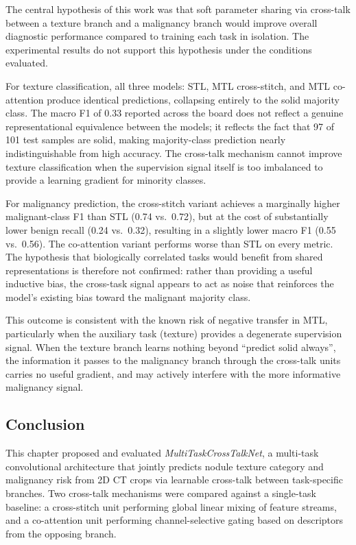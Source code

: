 The central hypothesis of this work was that soft parameter sharing via cross-talk between a texture branch and a malignancy branch would improve overall diagnostic performance compared to training each task in isolation. The experimental results do not support this hypothesis under the conditions evaluated.

For texture classification, all three models: STL, MTL cross-stitch, and MTL co-attention produce identical predictions, collapsing entirely to the solid majority class. The macro F1 of 0.33 reported across the board does not reflect a genuine representational equivalence between the models; it reflects the fact that 97 of 101 test samples are solid, making majority-class prediction nearly indistinguishable from high accuracy. The cross-talk mechanism cannot improve texture classification when the supervision signal itself is too imbalanced to provide a learning gradient for minority classes.

For malignancy prediction, the cross-stitch variant achieves a marginally higher malignant-class F1 than STL (0.74 vs.\ 0.72), but at the cost of substantially lower benign recall (0.24 vs.\ 0.32), resulting in a slightly lower macro F1 (0.55 vs.\ 0.56). The co-attention variant performs worse than STL on every metric. The hypothesis that biologically correlated tasks would benefit from shared representations is therefore not confirmed: rather than providing a useful inductive bias, the cross-task signal appears to act as noise that reinforces the model's existing bias toward the malignant majority class.

This outcome is consistent with the known risk of negative transfer in MTL, particularly when the auxiliary task (texture) provides a degenerate supervision signal. When the texture branch learns nothing beyond ``predict solid always'', the information it passes to the malignancy branch through the cross-talk units carries no useful gradient, and may actively interfere with the more informative malignancy signal.

\subsection{Conclusion}

This chapter proposed and evaluated \textit{MultiTaskCrossTalkNet}, a multi-task convolutional architecture that jointly predicts nodule texture category and malignancy risk from 2D CT crops via learnable cross-talk between task-specific branches. Two cross-talk mechanisms were compared against a single-task baseline: a cross-stitch unit performing global linear mixing of feature streams, and a co-attention unit performing channel-selective gating based on descriptors from the opposing branch.

